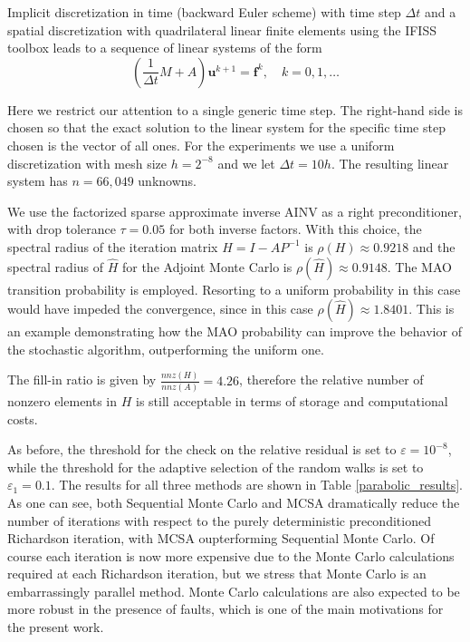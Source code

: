 \documentclass[final,leqno,onefignum,onetabnum]{siamltex1213}
\begin{document}
Implicit discretization in time (backward Euler scheme) with time step
$\Delta t$ and
a spatial discretization with quadrilateral linear finite elements using
the IFISS toolbox \cite{ifiss} leads
to a sequence of linear systems of the form
$$ \left (\frac{1}{\Delta t} M + A\right )\mathbf{u}^{k+1} = 
\mathbf{f}^k, \quad k=0,1,\ldots $$ 

Here we restrict our attention to a single generic time step.
The right-hand side is chosen so that the exact
solution to the linear system for the specific time step chosen is 
the vector of all ones. For the experiments we use a uniform discretization
with mesh size $h=2^{-8}$ and we let $\Delta t = 10h$.
The resulting linear system has $n=66,049$ unknowns.

We use the factorized
sparse approximate inverse AINV \cite{BT1998} as a right preconditioner,
with drop tolerance $\tau = 0.05$ for both inverse factors.
With this choice,
the spectral radius of the iteration matrix $H=I-AP^{-1}$ is $\rho(H)\approx
0.9218$ and the spectral radius of $\hat{H}$ for the Adjoint Monte Carlo is
$\rho(\hat{H})\approx 0.9148$. The MAO transition probability is employed.
 Resorting to a uniform probability in this case would have impeded
the
convergence, since in this case $\rho(\hat{H})\approx 1.8401$.
This is an example demonstrating how the MAO probability can 
improve the behavior of the stochastic algorithm, outperforming the
uniform one.

The fill-in ratio is given by $\frac{nnz(H)}{nnz(A)}=4.26$,
therefore the relative number of nonzero elements in $H$ is still acceptable
in terms of storage and computational costs.

As before,
the threshold for the check on the relative residual is set to $\varepsilon
=10^{-8}$, while the threshold
for the adaptive selection of the random walks is set
to $\varepsilon_1=0.1$.
The results for all three methods are shown in Table \ref{parabolic_results}. As 
one can see, both Sequential Monte Carlo and MCSA 
dramatically reduce the number of iterations with
respect to the purely deterministic
 preconditioned Richardson iteration, with MCSA oupterforming
Sequential Monte Carlo. 
Of course each iteration is now more expensive due to the Monte Carlo
calculations required at each Richardson iteration, but we stress
that Monte Carlo is an embarrassingly parallel method.
Monte Carlo calculations are also expected to be more robust in the
presence of faults, which is one of the main motivations for the
present work.
\end{document}

